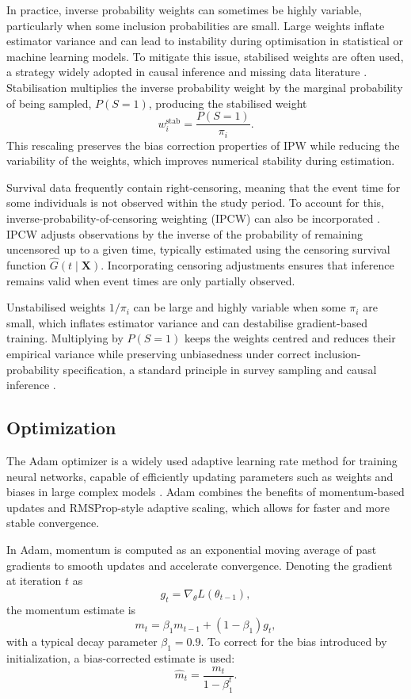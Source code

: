 \documentclass[a4paper,twoside,12pt]{report}
\begin{document}
In practice, inverse probability weights can sometimes be highly variable, particularly when some inclusion probabilities are small. Large weights inflate estimator variance and can lead to instability during optimisation in statistical or machine learning models. To mitigate this issue, stabilised weights are often used, a strategy widely adopted in causal inference and missing data literature \citep{Robins2000,Hernan2000}. Stabilisation multiplies the inverse probability weight by the marginal probability of being sampled, $P(S=1)$, producing the stabilised weight
\[
w_i^{\mathrm{stab}} = \frac{P(S=1)}{\pi_i}.
\]
This rescaling preserves the bias correction properties of IPW while reducing the variability of the weights, which improves numerical stability during estimation.

Survival data frequently contain right-censoring, meaning that the event time for some individuals is not observed within the study period. To account for this, inverse-probability-of-censoring weighting (IPCW) can also be incorporated \citep{Graf1999}. IPCW adjusts observations by the inverse of the probability of remaining uncensored up to a given time, typically estimated using the censoring survival function $\hat G(t \mid \boldsymbol{X})$. Incorporating censoring adjustments ensures that inference remains valid when event times are only partially observed.


Unstabilised weights \(1/\pi_i\) can be large and highly variable when some \(\pi_i\) are small, which inflates estimator variance and can destabilise gradient-based training. Multiplying by \(P(S=1)\) keeps the weights centred and reduces their empirical variance while preserving unbiasedness under correct inclusion-probability specification, a standard principle in survey sampling and causal inference \citep{Robins2000,Hernan2000}.

\subsection{Optimization}

The Adam optimizer is a widely used adaptive learning rate method for training neural networks, capable of efficiently updating parameters such as weights and biases in large complex models \citep{kingma2014adam}. Adam combines the benefits of momentum-based updates and RMSProp-style adaptive scaling, which allows for faster and more stable convergence.

In Adam, momentum is computed as an exponential moving average of past gradients to smooth updates and accelerate convergence. Denoting the gradient at iteration \(t\) as
\[
g_t = \nabla_\theta L(\theta_{t-1}),
\]
the momentum estimate is
\[
m_t = \beta_1 m_{t-1} + (1-\beta_1) g_t,
\]
with a typical decay parameter \(\beta_1 = 0.9\). To correct for the bias introduced by initialization, a bias-corrected estimate is used:
\[
\hat m_t = \frac{m_t}{1-\beta_1^t}.
\]
\end{document}
